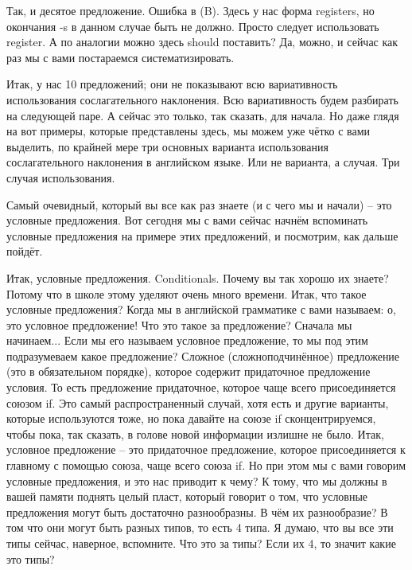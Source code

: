 \documentclass[main.tex]{subfiles}
\begin{document}
Так, и десятое предложение.
Ошибка в (B).
Здесь у нас форма registers, но окончания -s в данном случае быть не должно.
Просто следует использовать register.
А по аналогии можно здесь should поставить?
Да, можно, и сейчас как раз мы с вами постараемся систематизировать.

Итак, у нас 10 предложений; они не показывают всю вариативность использования сослагательного наклонения.
Всю вариативность будем разбирать на следующей паре.
А сейчас это только, так сказать, для начала.
Но даже глядя на вот примеры, которые представлены здесь, мы можем уже чётко с вами выделить, по крайней мере три основных варианта использования сослагательного наклонения в английском языке.
Или не варианта, а случая.
Три случая использования.

Самый очевидный, который вы все как раз знаете (и с чего мы и начали) -- это условные предложения.
Вот сегодня мы с вами сейчас начнём вспоминать условные предложения на примере этих предложений, и посмотрим, как дальше пойдёт.

\newpage
{}

Итак, условные предложения.
Conditionals.
Почему вы так хорошо их знаете?
Потому что в школе этому уделяют очень много времени.
Итак, что такое условные предложения?
Когда мы в английской грамматике с вами называем: о, это условное предложение!
Что это такое за предложение?
Сначала мы начинаем...
Если мы его называем условное предложение, то мы под этим подразумеваем какое предложение?
Сложное (сложноподчинённое) предложение (это в обязательном порядке), которое содержит придаточное предложение условия.
То есть предложение придаточное, которое чаще всего присоединяется союзом if.
Это самый распространенный случай, хотя есть и другие варианты, которые используются тоже, но пока давайте на союзе if сконцентрируемся, чтобы пока, так сказать, в голове новой информации излишне не было.
Итак, условное предложение -- это придаточное предложение, которое присоединяется к главному с помощью союза, чаще всего союза if.
Но при этом мы с вами говорим условные предложения, и это нас приводит к чему?
К тому, что мы должны в вашей памяти поднять целый пласт, который говорит о том, что условные предложения могут быть достаточно разнообразны.
В чём их разнообразие?
В том что они могут быть разных типов, то есть 4 типа.
Я думаю, что вы все эти типы сейчас, наверное, вспомните.
Что это за типы?
Если их 4, то значит какие это типы?
\end{document}
